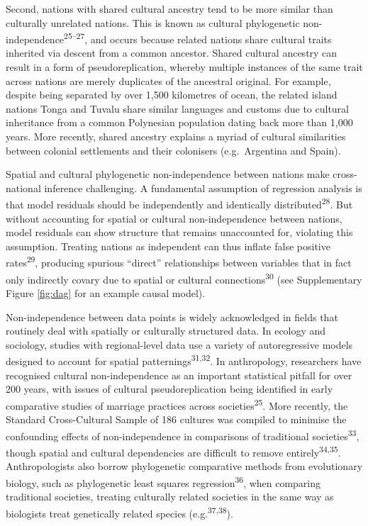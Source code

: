 \documentclass[english,man,floatsintext]{apa6}
\begin{document}
Second, nations with shared cultural ancestry tend to be more similar than culturally unrelated nations. This is known as cultural phylogenetic non-independence\textsuperscript{25--27}, and occurs because related nations share cultural traits inherited via descent from a common ancestor. Shared cultural ancestry can result in a form of pseudoreplication, whereby multiple instances of the same trait across nations are merely duplicates of the ancestral original. For example, despite being separated by over 1,500 kilometres of ocean, the related island nations Tonga and Tuvalu share similar languages and customs due to cultural inheritance from a common Polynesian population dating back more than 1,000 years. More recently, shared ancestry explains a myriad of cultural similarities between colonial settlements and their colonisers (e.g.~Argentina and Spain).

Spatial and cultural phylogenetic non-independence between nations make cross-national inference challenging. A fundamental assumption of regression analysis is that model residuals should be independently and identically distributed\textsuperscript{28}. But without accounting for spatial or cultural non-independence between nations, model residuals can show structure that remains unaccounted for, violating this assumption. Treating nations as independent can thus inflate false positive rates\textsuperscript{29}, producing spurious \enquote{direct} relationships between variables that in fact only indirectly covary due to spatial or cultural connections\textsuperscript{30} (see Supplementary Figure \ref{fig:dag} for an example causal model).

Non-independence between data points is widely acknowledged in fields that routinely deal with spatially or culturally structured data. In ecology and sociology, studies with regional-level data use a variety of autoregressive models designed to account for spatial patternings\textsuperscript{31,32}. In anthropology, researchers have recognised cultural non-independence as an important statistical pitfall for over 200 years, with issues of cultural pseudoreplication being identified in early comparative studies of marriage practices across societies\textsuperscript{25}. More recently, the Standard Cross-Cultural Sample of 186 cultures was compiled to minimise the confounding effects of non-independence in comparisons of traditional societies\textsuperscript{33}, though spatial and cultural dependencies are difficult to remove entirely\textsuperscript{34,35}. Anthropologists also borrow phylogenetic comparative methods from evolutionary biology, such as phylogenetic least squares regression\textsuperscript{36}, when comparing traditional societies, treating culturally related societies in the same way as biologists treat genetically related species (e.g.\textsuperscript{37,38}).
\end{document}

